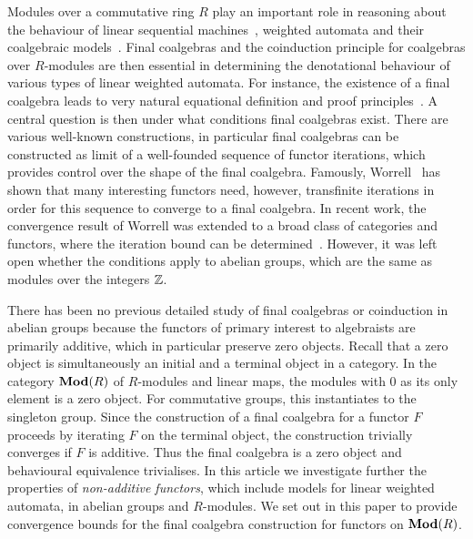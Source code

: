 \documentclass[runningheads]{llncs}
\begin{document}
Modules over a commutative ring $R$ play an important role in reasoning about the behaviour of linear sequential machines~\cite{eilenberg74}, weighted automata and their coalgebraic models~\cite{Basold-LinearCiruits,bonchi12,Boreale09,Milius10:SoundCompleteCalculus}.
Final coalgebras and the coinduction principle for coalgebras over $R$-modules are then essential in determining the denotational behaviour of various types of linear weighted automata.
For instance, the existence of a final coalgebra leads to very natural equational definition and proof principles~\cite{Rutten00,HKR14:SDE,Rutten05:CoindCalcStreams,ruttenTutorialCoinductiveStream2005}.
A central question is then under what conditions final coalgebras exist.
There are various well-known constructions, in particular final coalgebras can be constructed as limit of a well-founded sequence of functor iterations, which provides control over the shape of the final coalgebra.
Famously, Worrell~\cite{Worrell99,Worrell05} has shown that many interesting functors need, however, transfinite iterations in order for this sequence to converge to a final coalgebra.
In recent work, the convergence result of Worrell was extended to a broad class of categories and functors, where the iteration bound can be determined~\cite{AdamekEA25}.
However, it was left open whether the conditions apply to abelian groups, which are the same as modules over the integers $\mathbb{Z}$.

There has been no previous detailed study of final coalgebras or coinduction in abelian groups because the functors of primary interest to algebraists are primarily additive, which in particular preserve zero objects.
Recall that a zero object is simultaneously an initial and a terminal object in a category.
In the category $\operatorname{\mathbf{Mod}}(R)$ of $R$-modules and linear maps, the modules with $0$ as its only element is a zero object.
For commutative groups, this instantiates to the singleton group.
Since the construction of a final coalgebra for a functor $F$ proceeds by iterating $F$ on the terminal object, the construction trivially converges if $F$ is additive.
Thus the final coalgebra is a zero object and behavioural equivalence trivialises.
In this article we investigate further the properties of \emph{non-additive functors}, which include models for linear weighted automata, in abelian groups and $R$-modules.
We set out in this paper to provide convergence bounds for the final coalgebra construction for functors on $\operatorname{\mathbf{Mod}}(R)$.
\end{document}
